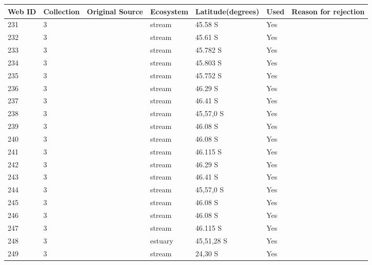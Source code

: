 \documentclass[12pt]{article}
\begin{document}
\begin{landscape}
    \begin{table}[h!]
    \centering
    {\footnotesize
      \begin{tabular}{p{2.8cm}p{1.3cm}p{3cm}p{2.2cm}p{2.5cm}lp{8.2cm}}
        \hline
        Web ID & Collection & Original Source & Ecosystem & Latitude(degrees) & Used  & Reason for rejection  \\
        \hline
        231   & 3 & \cite{Thompson2004c}  & stream & 45.58 S & Yes   &       \\
        232   & 3 & \cite{Thompson2004c}  & stream & 45.61 S & Yes   &       \\
        233   & 3 & \cite{Thompson2004c}  & stream & 45.782 S & Yes   &       \\
        234   & 3 & \cite{Thompson2004c}  & stream & 45.803 S & Yes   &       \\
        235   & 3 & \cite{Thompson2004c}  & stream & 45.752 S & Yes   &       \\
        236   & 3 & \cite{Thompson2004c}  & stream & 46.29 S & Yes  &     \\
        237   & 3 & \cite{Thompson2004c}  & stream & 46.41 S & Yes   &       \\
        238   & 3 & \cite{Thompson2004c}  & stream & 45,57,0 S & Yes  &     \\
        239   & 3 & \cite{Thompson2004c}  & stream & 46.08 S & Yes   &       \\
        240   & 3 & \cite{Thompson2004c}  & stream & 46.08 S & Yes  &     \\
        241   & 3 & \cite{Thompson2004c}  & stream & 46.115 S & Yes   &       \\
        242   & 3 & \cite{Thompson2004c}  & stream & 46.29 S & Yes   &       \\
        243   & 3 & \cite{Thompson2004c}  & stream & 46.41 S & Yes   &       \\
        244   & 3 & \cite{Thompson2004c}  & stream & 45,57,0 S & Yes  &     \\
        245   & 3 & \cite{Thompson2004c}  & stream & 46.08 S & Yes   &       \\
        246   & 3 & \cite{Thompson2004c}  & stream & 46.08 S & Yes  &     \\
        247   & 3 & \cite{Thompson2004c}  & stream & 46.115 S & Yes   &       \\
        248   & 3 & \cite{Thompson2004}  & estuary & 45,51,28 S & Yes   &        \\
        249   & 3 & \cite{Angelini2005}  & stream & 24,30 S & Yes  &     \\

\end{tabular}}
\end{table}
\end{landscape}
\end{document}
